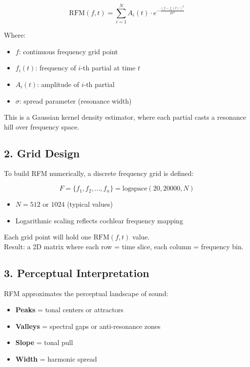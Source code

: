 \documentclass{article}
\begin{document}
\[
\text{RFM}(f, t) = \sum_{i=1}^N A_i(t) \cdot e^{-\frac{(f - f_i(t))^2}{2\sigma^2}}
\]

Where:

\begin{itemize}
    \item $f$: continuous frequency grid point
    \item $f_i(t)$: frequency of $i$-th partial at time $t$
    \item $A_i(t)$: amplitude of $i$-th partial
    \item $\sigma$: spread parameter (resonance width)
\end{itemize}

This is a Gaussian kernel density estimator, where each partial casts a resonance hill over frequency space.

\subsection*{2. Grid Design}

To build RFM numerically, a discrete frequency grid is defined:

\[
F = \{ f_1, f_2, ..., f_n \} = \text{logspace}(20, 20000, N)
\]

\begin{itemize}
    \item $N = 512$ or $1024$ (typical values)
    \item Logarithmic scaling reflects cochlear frequency mapping
\end{itemize}

Each grid point will hold one $\text{RFM}(f, t)$ value.\\
Result: a 2D matrix where each row = time slice, each column = frequency bin.

\subsection*{3. Perceptual Interpretation}

RFM approximates the perceptual landscape of sound:

\begin{itemize}
    \item \textbf{Peaks} = tonal centers or attractors
    \item \textbf{Valleys} = spectral gaps or anti-resonance zones
    \item \textbf{Slope} = tonal pull
    \item \textbf{Width} = harmonic spread
\end{itemize}
\end{document}

